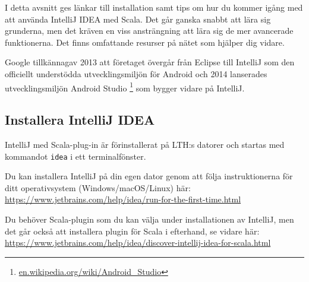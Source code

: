 I detta avsnitt ges länkar till installation samt tips om hur du kommer igång med att använda IntelliJ IDEA med Scala. Det går ganska snabbt att lära sig grunderna, men det kräven en viss ansträngning att lära sig de mer avancerade funktionerna. Det finns omfattande resurser på nätet som hjälper dig vidare.

Google tillkännagav 2013 att företaget övergår från Eclipse till IntelliJ som den officiellt understödda utvecklingsmiljön för Android och 2014 lanserades utvecklingsmiljön Android Studio%
\footnote {\href{https://en.wikipedia.org/wiki/Android_Studio}{en.wikipedia.org/wiki/Android\_Studio}}
 som bygger vidare på IntelliJ.

\subsection{Installera IntelliJ IDEA}\label{appendix:ide:intellij:install}

IntelliJ med Scala-plug-in är förinstallerat på LTH:s datorer och startas med kommandot \texttt{idea} i ett terminalfönster.

Du kan installera IntelliJ på din egen dator genom att följa instruktionerna för ditt operativsystem (Windows/macOS/Linux) här: \\
\url{https://www.jetbrains.com/help/idea/run-for-the-first-time.html}


Du behöver Scala-plugin som du kan välja under installationen av IntelliJ, men det går också att installera plugin för Scala i efterhand, se vidare här:\\
\url{https://www.jetbrains.com/help/idea/discover-intellij-idea-for-scala.html} 








